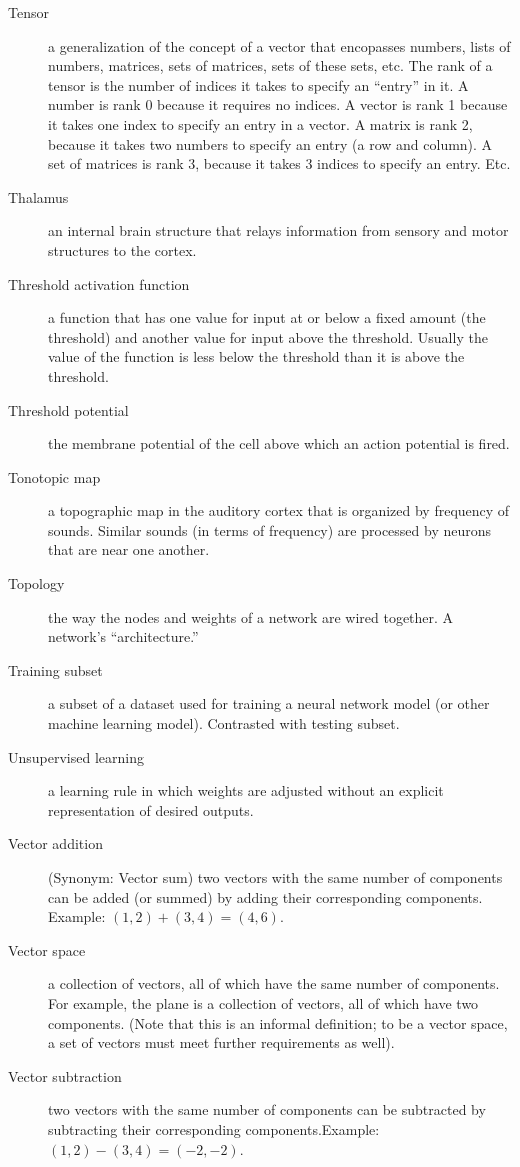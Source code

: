 \begin{description}
\item[Tensor] a generalization of the concept of a vector that encopasses numbers, lists of numbers, matrices, sets of matrices, sets of these sets, etc. The rank of a  tensor is the number of indices it takes to specify an ``entry'' in it.  A number is rank 0 because it requires no indices. A vector is rank 1 because it takes one index to specify an entry in a vector. A matrix is rank 2, because it takes two numbers to specify an entry (a row and column). A set of matrices is rank 3, because it takes 3 indices to specify an entry. Etc.
\item[Thalamus] an internal brain structure that relays information from sensory and motor structures to the cortex.
\item[Threshold activation function] a function that has one value for  input at or below a fixed amount (the threshold) and another value for input above the threshold. Usually the value of the function is less below the  threshold than it is above the threshold.
\item[Threshold potential] the membrane potential of the cell above which an action potential is fired. 
\item[Tonotopic map] a topographic map in the auditory cortex that is organized by frequency of sounds. Similar sounds (in terms of frequency) are processed by neurons that are near one another.
\item[Topology] the way the nodes and weights of a network are wired together. A network's ``architecture.''
\item[Training subset] a subset of a dataset used for training a neural network model (or other machine learning model). Contrasted with testing subset.
\item[Unsupervised learning] a learning rule in which weights are adjusted without an explicit representation of desired outputs.
\item[Vector addition] (Synonym: Vector sum) two vectors with the same number of components can be added (or summed) by adding their corresponding components. Example: $(1,2) + (3,4) = (4,6)$.
\item[Vector space] a collection of vectors, all of which have the same number of components. For example, the plane is a collection of vectors, all of which have two components. (Note that this is an  informal definition; to be a vector space, a set of vectors must meet further requirements as well).
\item[Vector subtraction] two vectors with the same number of components can be subtracted by subtracting their corresponding components.Example: $(1,2) - (3,4) = (-2,-2)$.

\end{description}
